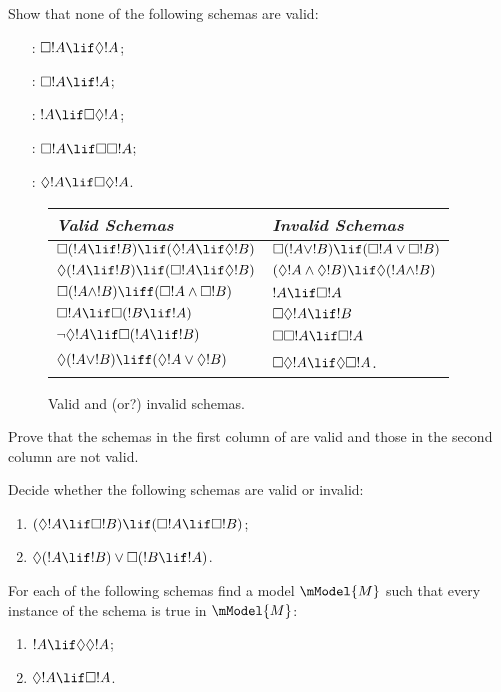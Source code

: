 \documentclass[../../../include/open-logic-section]{subfiles}
\begin{document}
\begin{prob}
  Show that none of the following schemas are valid:
  \begin{enumerate}
    \item[\Ax{D}:] \quad $\Box !A \lif \Diamond !A$;
    \item[\Ax{T}:] \quad $\Box !A \lif !A$;
    \item[\Ax{B}:] \quad $!A \lif \Box\Diamond !A$;
    \item[\Ax{4}:] \quad $\Box !A \lif \Box \Box !A$;
    \item[\Ax{5}:] \quad $\Diamond !A \lif \Box \Diamond
      !A$.
  \end{enumerate}
\end{prob}

\begin{figure}[t]
    \centering
    \begin{tabular}{| l || l |}
      \hline
      {\emph{Valid Schemas}} & {\emph{Invalid Schemas}} \\
      \hline\hline
      $\Box(!A \lif !B) \lif (\Diamond !A \lif \Diamond !B)$
      & $\Box (!A \lor !B) \lif (\Box !A \lor \Box !B)$ \\
      $\Diamond (!A \lif !B) \lif (\Box !A \lif \Diamond
      !B)$ 
      & $(\Diamond !A \land \Diamond !B) \lif \Diamond (!A
      \land !B)$\\
      $\Box (!A \land !B) \liff (\Box !A \land \Box !B)$
      & $!A \lif \Box !A$ \\
      $\Box !A \lif \Box (!B \lif !A)$ 
      & $\Box \Diamond !A \lif !B$ \\
      $\lnot \Diamond !A \lif \Box (!A \lif !B)$
      & $\Box \Box !A \lif \Box !A$ \\
      $\Diamond (!A \lor !B) \liff (\Diamond !A \lor
      \Diamond !B)$
      & $\Box \Diamond !A \lif \Diamond \Box !A$. \\
      \hline
    \end{tabular}
    \caption{Valid and (or?) invalid schemas.}
\end{figure}

\begin{prob}%
  Prove that the schemas in the first column of
   are valid and those in
  the second column are not valid.
\end{prob}

\begin{prob}
  Decide whether the following schemas are valid or invalid:
  \begin{enumerate}
  \item $(\Diamond !A \lif \Box !B) \lif (\Box !A \lif \Box
    !B)$;
  \item $\Diamond(!A \lif !B) \lor \Box(!B \lif !A)$.
  \end{enumerate}
\end{prob}

\begin{prob}
  For each of the following schemas find a model $\mModel{M}$ such
  that every instance of the schema is true in $\mModel{M}$:
  \begin{enumerate}
  \item $!A \lif \Diamond\Diamond !A$;
  \item $\Diamond !A \lif \Box !A$.
  \end{enumerate}
\end{prob}
\end{document}
